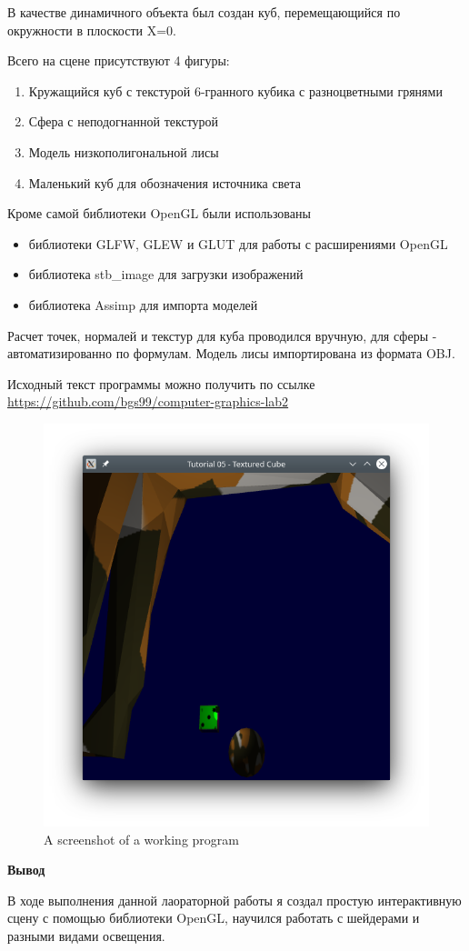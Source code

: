 \documentclass[a4paper,14pt]{extreport}
\begin{document}
В качестве динамичного объекта был создан куб, перемещающийся по окружности в плоскости X=0.

Всего на сцене присутствуют 4 фигуры:
\begin{enumerate}
    \item Кружащийся куб с текстурой 6-гранного кубика с разноцветными грянями
    \item Сфера с неподогнанной текстурой
    \item Модель низкополигональной лисы
    \item Маленький куб для обозначения источника света
\end{enumerate}

Кроме самой библиотеки OpenGL были использованы

\begin{itemize}
    \item библиотеки GLFW, GLEW и GLUT для работы с расширениями OpenGL
    \item библиотека stb\_image для загрузки изображений
    \item библиотека Assimp для импорта моделей
\end{itemize}

Расчет точек, нормалей и текстур для куба проводился вручную, для сферы - автоматизированно по формулам.
Модель лисы импортирована из формата OBJ.

Исходный текст программы можно получить по ссылке \url{https://github.com/bgs99/computer-graphics-lab2}

\begin{figure}[H]
    \includegraphics[width=\linewidth]{Screenshot.png}
    \caption{A screenshot of a working program}
    \label{fig:screen1}
\end{figure}

\par \textbf{Вывод}

В ходе выполнения данной лаораторной работы я создал простую интерактивную сцену с помощью библиотеки OpenGL, научился работать с шейдерами и разными видами освещения.
\end{document}
